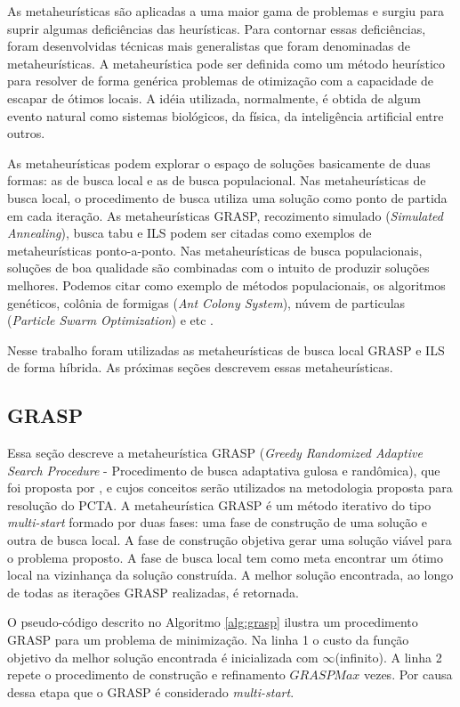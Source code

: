 As metaheurísticas são aplicadas a uma maior gama de problemas e surgiu para
suprir algumas deficiências das heurísticas. Para contornar essas deficiências,
foram desenvolvidas técnicas mais generalistas que foram denominadas de
metaheurísticas. A metaheurística pode ser definida como um método
heurístico para resolver de forma genérica problemas de otimização com a
capacidade de escapar de ótimos locais. A idéia utilizada, normalmente, é
obtida de algum evento natural como sistemas biológicos, da física, da
inteligência artificial entre outros.

As metaheurísticas podem explorar o espaço de soluções basicamente de duas
formas: as de busca local e as de busca populacional. Nas metaheurísticas de
busca local, o procedimento de busca utiliza uma solução como ponto de partida
em cada iteração. As metaheurísticas GRASP, recozimento simulado
(\textit{Simulated Annealing}), busca tabu e ILS podem ser citadas como
exemplos de metaheurísticas ponto-a-ponto. Nas metaheurísticas de busca
populacionais, soluções de boa qualidade são combinadas com o intuito de
produzir soluções melhores. Podemos citar como exemplo de métodos
populacionais, os algoritmos genéticos, colônia de formigas (\textit{Ant Colony
System}), núvem de particulas (\textit{Particle Swarm Optimization}) e etc \cite{maritan2009}.

Nesse trabalho foram utilizadas as metaheurísticas de busca local GRASP e ILS
de forma híbrida. As próximas seções descrevem essas metaheurísticas.

\subsection{GRASP}

Essa seção descreve a metaheurística GRASP (\textit{Greedy Randomized Adaptive
Search Procedure} - Procedimento de busca adaptativa gulosa e randômica), que
foi proposta por \cite{resende1995}, e cujos conceitos serão
utilizados na metodologia proposta para resolução do PCTA. A metaheurística
GRASP é um método iterativo do tipo \textit{multi-start} formado por duas
fases: uma fase de construção de uma solução e outra de busca local. A fase de
construção objetiva gerar uma solução viável para o problema proposto. A fase
de busca local tem como meta encontrar um ótimo local na vizinhança da solução
construída. A melhor solução encontrada, ao longo de todas as
iterações GRASP realizadas, é retornada.

O pseudo-código descrito no Algoritmo \ref{alg:grasp} ilustra um procedimento
GRASP para um problema de minimização. Na linha 1 o custo da função objetivo da
melhor solução encontrada é inicializada com $\infty$(infinito). A linha 2
repete o procedimento de construção e refinamento $GRASPMax$ vezes. Por causa
dessa etapa que o GRASP é considerado \textit{multi-start}.

